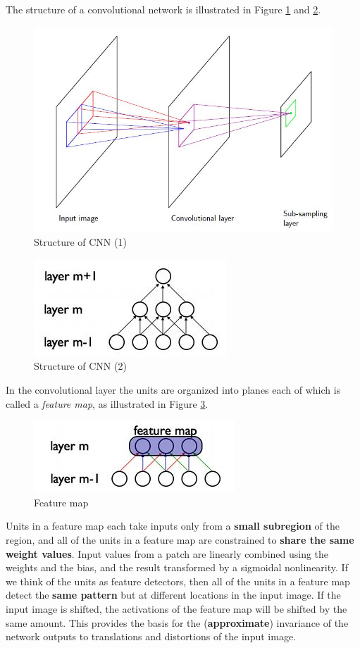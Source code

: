 \documentclass[a4paper]{report}
\newcommand{\imp}[1]{{\color{blue}\textit{#1}}}
\begin{document}
The structure of a convolutional network is illustrated in Figure \ref{CNN1} and \ref{CNN2}.
\begin{figure}
	\centering
	\includegraphics[scale = 0.5]{CNN0}
	\caption{Structure of CNN (1)}\label{CNN1}
\end{figure}
\begin{figure}
	\centering
	\includegraphics[scale = 0.5]{CNN}
	\caption{Structure of CNN (2)}\label{CNN2}
\end{figure}

In the convolutional layer the units are organized into planes each of which is called a \imp{feature map}, as illustrated in Figure \ref{CNN3}. 
\begin{figure}
	\centering
	\includegraphics[scale = 0.5]{CNN2}
	\caption{Feature map}\label{CNN3}
\end{figure}
Units in a feature map each take inputs only from a \textbf{small subregion} of the region, and all of the units in a feature map are constrained to \textbf{share the same weight values}. Input values from a patch are linearly combined using the weights and the bias, and the result transformed by a sigmoidal nonlinearity. If we think of the units as feature detectors, then all of the units in a feature map detect the \textbf{same pattern} but at different locations in the input image. If the input image is shifted, the activations of the feature map will be shifted by the same amount. This provides the basis for the (\textbf{approximate}) invariance of the network outputs to translations and distortions of the input image.
\end{document}
